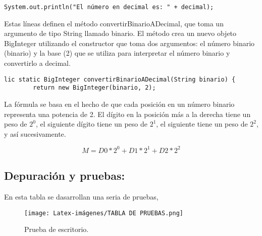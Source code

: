 \begin{lstlisting}[style=javaStyle]
System.out.println("El número en decimal es: " + decimal);

\end{lstlisting}

Estas líneas definen el método convertirBinarioADecimal, que toma un argumento de tipo String llamado binario. El método crea un nuevo objeto BigInteger utilizando el constructor que toma dos argumentos: el número binario (binario) y la base (2) que se utiliza para interpretar el número binario y convertirlo a decimal. 

\begin{lstlisting}[style=javaStyle]
lic static BigInteger convertirBinarioADecimal(String binario) {
        return new BigInteger(binario, 2);

\end{lstlisting}

\text La fórmula se basa en el hecho de que cada posición en un número binario representa una potencia de 2. El dígito en la posición más a la derecha tiene un peso de \(2^0\), el siguiente dígito tiene un peso de \(2^1\), el siguiente tiene un peso de \(2^2\), y así sucesivamente.
\space

\begin{equation}

M = D0 * 2^0 + D1 * 2^1 + D2 * 2^2

\end{equation}


\subsection{\textbf{Depuración y pruebas:}}
En esta tabla se dasarrollan una seria de pruebas, 
\begin{figure}[H]
    \centering
    \texttt{[image: Latex-imágenes/TABLA DE PRUEBAS.png]}
    \caption{Prueba de escritorio.}
\end{figure}
